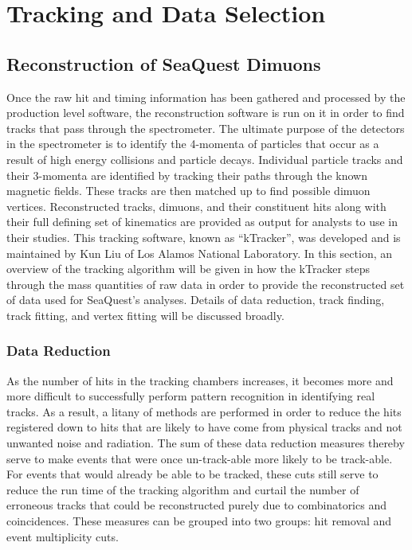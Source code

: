 
\chapter{Tracking and Data Selection}

\section{Reconstruction of SeaQuest Dimuons}

Once the raw hit and timing information has been gathered and processed by the production level software, the reconstruction software is run on it in order to find tracks that pass through the spectrometer. The ultimate purpose of the detectors in the spectrometer is to identify the 4-momenta of particles that occur as a result of high energy collisions and particle decays. Individual particle tracks and their 3-momenta are identified by tracking their paths through the known magnetic fields.  These tracks are then matched up to find possible dimuon vertices. Reconstructed tracks, dimuons, and their constituent hits along with their full defining set of kinematics are provided as output for analysts to use in their studies. This tracking software, known as ``kTracker'', was developed and is maintained by Kun Liu of Los Alamos National Laboratory.  In this section, an overview of the tracking algorithm will be given in how the kTracker steps through the mass quantities of raw data in order to provide the reconstructed set of data used for SeaQuest's analyses. Details of data reduction, track finding, track fitting, and vertex fitting will be discussed broadly. 

\subsection{Data Reduction}

As the number of hits in the tracking chambers increases, it becomes more and more difficult to successfully perform pattern recognition in identifying real tracks. As a result, a litany of methods are performed in order to reduce the hits registered down to hits that are likely to have come from physical tracks and not unwanted noise and radiation. The sum of these data reduction measures thereby serve to make events that were once un-track-able more likely to be track-able. For events that would already be able to be tracked, these cuts still serve to reduce the run time of the tracking algorithm and curtail the number of erroneous tracks that could be reconstructed purely due to combinatorics and coincidences. These measures can be grouped into two groups: hit removal and event multiplicity cuts.

